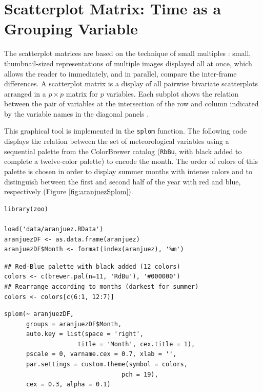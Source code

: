 \documentclass[smallroyalvopaper]{memoir}
\begin{document}
\section{Scatterplot Matrix: Time as a Grouping Variable \label{SEC:groupVariable}}
\label{sec:org8e8055b}

The scatterplot matrices are based on the technique of small multiples
\cite{Tufte1990}: small, thumbnail-sized representations of multiple
images displayed all at once, which allows the reader to immediately,
and in parallel, compare the inter-frame differences.  A scatterplot
matrix is a display of all pairwise bivariate scatterplots arranged in
a \(p \times p\) matrix for \(p\) variables. Each subplot shows the
relation between the pair of variables at the intersection of the row
and column indicated by the variable names in the diagonal panels
\cite{Friendly.Denis2005}.

This graphical tool is implemented in the \texttt{splom} function. The
following code displays the relation between the set of
meteorological variables using a sequential palette from the
ColorBrewer catalog (\texttt{RbBu}, with black added to complete a
twelve-color palette) to encode the month. The order of colors of
this palette is chosen in order to display summer months with
intense colors and to distinguish between the first and second
half of the year with red and blue, respectively (Figure
\ref{fig:aranjuezSplom}).



\lstset{language=r,label= ,caption= ,captionpos=b,numbers=none}
\begin{lstlisting}
library(zoo)

load('data/aranjuez.RData')
aranjuezDF <- as.data.frame(aranjuez)
aranjuezDF$Month <- format(index(aranjuez), '%m')
\end{lstlisting}

\lstset{language=r,label= ,caption= ,captionpos=b,numbers=none}
\begin{lstlisting}
## Red-Blue palette with black added (12 colors)
colors <- c(brewer.pal(n=11, 'RdBu'), '#000000')
## Rearrange according to months (darkest for summer)
colors <- colors[c(6:1, 12:7)]
\end{lstlisting}

\lstset{language=r,label= ,caption= ,captionpos=b,numbers=none}
\begin{lstlisting}
splom(~ aranjuezDF, 
      groups = aranjuezDF$Month,
      auto.key = list(space = 'right', 
                    title = 'Month', cex.title = 1),
      pscale = 0, varname.cex = 0.7, xlab = '',
      par.settings = custom.theme(symbol = colors,
                                pch = 19),
      cex = 0.3, alpha = 0.1)
\end{lstlisting}
\end{document}

